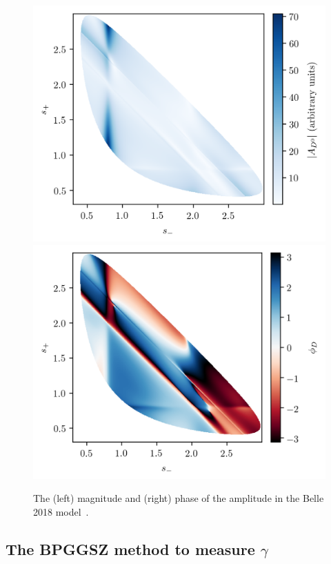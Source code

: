 \begin{figure}[tb]
    \centering
    \includegraphics[width=0.48\columnwidth]{figures/theory/ampD.png}
    \includegraphics[width=0.48\columnwidth]{figures/theory/phiD.png}
    \caption{The (left) magnitude and (right) phase of the \DtoKspipi amplitude in the Belle 2018 model~\cite{Belle2018}. }
    \label{fig:amplitude_models}
\end{figure}


\subsection{\texorpdfstring{The BPGGSZ method to measure $\gamma$}{The BPGGSZ method to measure gamma}} %
\label{sub:the_ggsz_method_to_measure_gamma}


